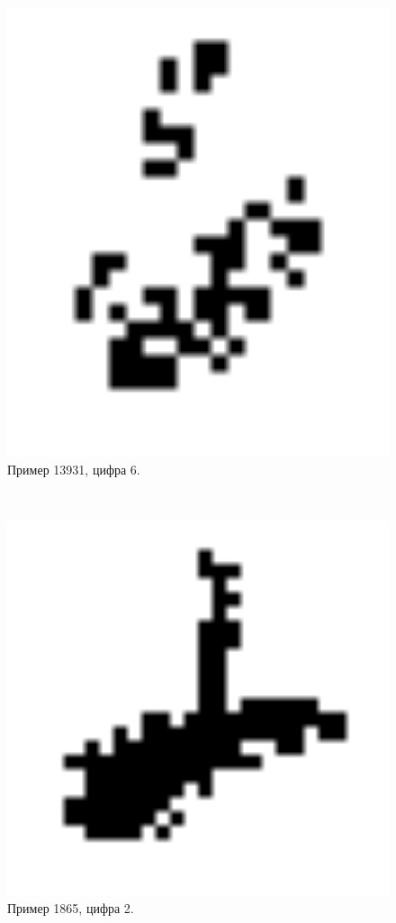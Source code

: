 \documentclass[oneside,final,14pt]{extreport}
\begin{document}
\\ 
\begin{figure}[b]
    \centering
    \includegraphics[width=1.0\textwidth]{13931_6.eps}
    \caption{Пример 13931, цифра 6.}
    \label{fig:13931_6}
\end{figure}
\\
\begin{figure}
    \centering
    \includegraphics[width=1.0\textwidth]{1865_2.eps}
    \caption{Пример 1865, цифра 2.}
    \label{fig:1865_2}
\end{figure}
\end{document}
